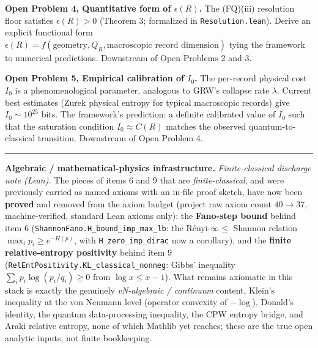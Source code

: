 \documentclass[11pt,a4paper]{article}
\begin{document}
\textbf{Open Problem 4, Quantitative form of $\epsilon(R)$.}
The (FQ)(iii) resolution floor satisfies $\epsilon(R) > 0$ (Theorem 3; formalized in \texttt{Resolution.lean}). Derive an explicit functional form $\epsilon(R) = f(\text{geometry}, Q_R, \text{macroscopic record dimension})$ tying the framework to numerical predictions. Downstream of Open Problems 2 and 3.

\textbf{Open Problem 5, Empirical calibration of $I_0$.}
The per-record physical cost $I_0$ is a phenomenological parameter, analogous to GRW's collapse rate $\lambda$. Current best estimates (Zurek physical entropy for typical macroscopic records) give $I_0 \sim 10^{25}$ bits. The framework's prediction: a definite calibrated value of $I_0$ such that the saturation condition $I_0 \approx C(R)$ matches the observed quantum-to-classical transition. Downstream of Open Problem 4.

\medskip\hrule\medskip

\textbf{Algebraic / mathematical-physics infrastructure.} \emph{Finite-classical discharge note (Lean).} The pieces of items 6 and 9 that are \emph{finite-classical}, and were previously carried as named axioms with an in-file proof sketch, have now been \textbf{proved} and removed from the axiom budget (project raw axiom count $40 \to 37$, machine-verified, standard Lean axioms only): the \textbf{Fano-step bound} behind item 6 (\texttt{ShannonFano.H\_bound\_imp\_max\_lb}: the Rényi-$\infty \le$ Shannon relation $\max_i p_i \ge e^{-H(p)}$, with \texttt{H\_zero\_imp\_dirac} now a corollary), and the \textbf{finite relative-entropy positivity} behind item 9 (\texttt{RelEntPositivity.KL\_classical\_nonneg}: Gibbs' inequality $\sum_i p_i\log(p_i/q_i)\ge 0$ from $\log x \le x-1$). What remains axiomatic in this stack is exactly the genuinely \emph{vN-algebraic / continuum} content, Klein's inequality at the von Neumann level (operator convexity of $-\log$), Donald's identity, the quantum data-processing inequality, the CPW entropy bridge, and Araki relative entropy, none of which Mathlib yet reaches; these are the true open analytic inputs, not finite bookkeeping.
\end{document}
